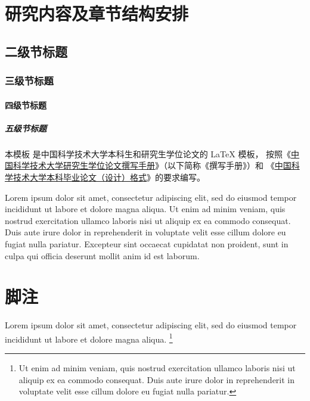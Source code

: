 \section{研究内容及章节结构安排}

\subsection{二级节标题}

\subsubsection{三级节标题}

\paragraph{四级节标题}

\subparagraph{五级节标题}

本模板  是中国科学技术大学本科生和研究生学位论文的 \LaTeX{}
模板， 按照《\href{https://gradschool.ustc.edu.cn/static/upload/article/picture/ce3b02e5f0274c90b9331ef50ae1ac26.pdf}
{中国科学技术大学研究生学位论文撰写手册}》（以下简称《撰写手册》）和
《\href{https://www.teach.ustc.edu.cn/?attachment_id=13867}
{中国科学技术大学本科毕业论文（设计）格式}》的要求编写。

Lorem ipsum dolor sit amet, consectetur adipiscing elit, sed do eiusmod tempor
incididunt ut labore et dolore magna aliqua.
Ut enim ad minim veniam, quis nostrud exercitation ullamco laboris nisi ut
aliquip ex ea commodo consequat.
Duis aute irure dolor in reprehenderit in voluptate velit esse cillum dolore eu
fugiat nulla pariatur.
Excepteur sint occaecat cupidatat non proident, sunt in culpa qui officia
deserunt mollit anim id est laborum.



\section{脚注}

Lorem ipsum dolor sit amet, consectetur adipiscing elit, sed do eiusmod tempor
incididunt ut labore et dolore magna aliqua.
\footnote{Ut enim ad minim veniam, quis nostrud exercitation ullamco laboris
  nisi ut aliquip ex ea commodo consequat.
  Duis aute irure dolor in reprehenderit in voluptate velit esse cillum dolore
  eu fugiat nulla pariatur.}
